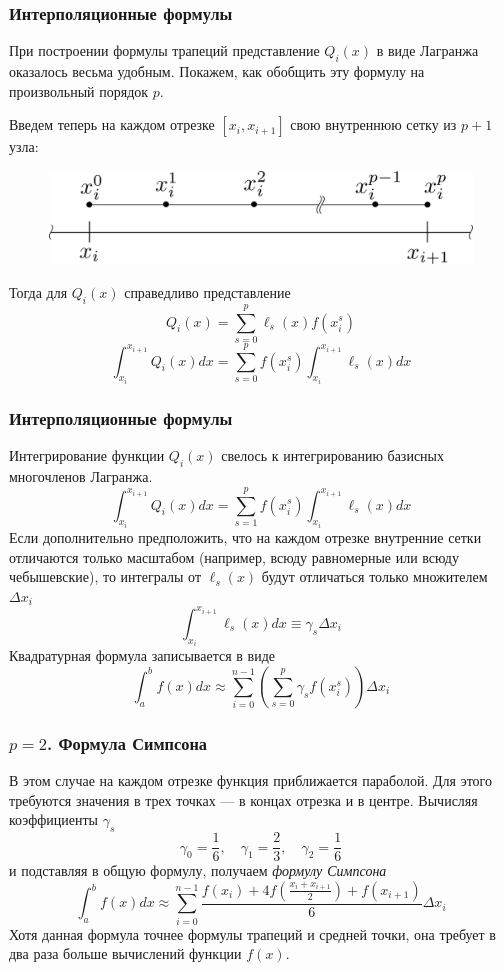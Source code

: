 \documentclass[apectratio=43,unicode]{beamer}
\begin{document}
\begin{frame}
\frametitle{Интерполяционные формулы}
	При построении формулы трапеций представление $Q_i(x)$ в виде Лагранжа оказалось
	весьма удобным. Покажем, как обобщить эту формулу на произвольный порядок $p$.
	\pause

	Введем теперь на каждом отрезке $[x_i, x_{i+1}]$ свою внутреннюю сетку из
	$p+1$ узла:
	\begin{figure}
	\centering
	\includegraphics[width=.6\textwidth]{subgrid.png}
	\end{figure}
	\pause

	Тогда для $Q_i(x)$ справедливо представление
	\[
	Q_i(x) = \sum_{s=0}^p \ell_s(x) f(x_i^s)
	\]
	\[
	\int_{x_i}^{x_{i+1}} Q_i(x) dx = \sum_{s=0}^p f(x_i^s) \int_{x_i}^{x_{i+1}} \ell_s(x) dx
	\]
\end{frame}

\begin{frame}
\frametitle{Интерполяционные формулы}
	Интегрирование функции $Q_i(x)$ свелось к интегрированию базисных многочленов Лагранжа.
	\[
	\int_{x_i}^{x_{i+1}} Q_i(x) dx = \sum_{s=1}^p f(x_i^s) \int_{x_i}^{x_{i+1}} \ell_s(x) dx
	\]
	\pause
	Если дополнительно предположить, что на каждом отрезке внутренние сетки отличаются только масштабом
	(например, всюду равномерные или всюду чебышевские),
	то интегралы от $\ell_s(x)$ будут отличаться только множителем $\Delta x_i$
	\[
	\int_{x_i}^{x_{i+1}} \ell_s(x) dx \equiv \gamma_s \Delta x_i
	\]
	\pause
	Квадратурная формула записывается в виде
	\[
	\int_a^b f(x) dx \approx \sum_{i=0}^{n-1} \left(\sum_{s=0}^p \gamma_s f(x_i^s)\right)\Delta x_i
	\]
\end{frame}

\begin{frame}
\frametitle{$p=2$. Формула Симпсона}
	В этом случае на каждом отрезке функция приближается параболой. Для этого требуются значения в трех точках ---
	в концах отрезка и в центре. Вычисляя коэффициенты $\gamma_s$
	\[
	\gamma_0 = \frac{1}{6}, \quad \gamma_1 = \frac{2}{3}, \quad \gamma_2 = \frac{1}{6}
	\]
	и подставляя в общую формулу, получаем \emph{формулу Симпсона}
	\[
	\int_a^b f(x) dx \approx \sum_{i=0}^{n-1} \frac{f(x_i) + 4f\left(\frac{x_i+x_{i+1}}{2}\right) + f(x_{i+1})}{6} \Delta x_i
	\]
	Хотя данная формула точнее формулы трапеций и средней точки, она требует в два раза больше вычислений функции $f(x)$.
\end{frame}
\end{document}
